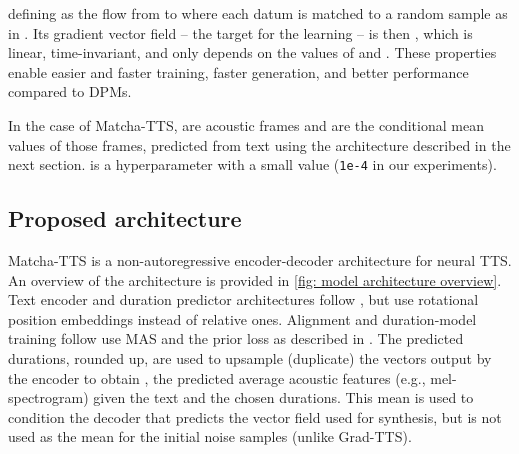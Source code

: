 \documentclass[british]{article}
\begin{document}
defining  as the flow from  to  where each datum  is matched to a random sample  as in \cite{lipman2023flow}.
Its gradient vector field -- the target for the learning -- is then , which is linear, time-invariant, and only depends on the values of  and .
These properties enable easier and faster training, faster generation, and better performance compared to DPMs.


In the case of Matcha-TTS,  are acoustic frames and  are the conditional mean values of those frames, predicted from text using the architecture described in the next section.
 is a hyperparameter with a small value (\texttt{1e-4} in our experiments).








\subsection{Proposed architecture}
\label{ssec:matcha}


Matcha-TTS is a non-autoregressive encoder-decoder architecture for neural TTS.
An overview of the architecture is provided in \cref{fig: model architecture overview}.
Text encoder and duration predictor architectures follow \cite{kim2020glow,popov2021grad}, but use rotational position embeddings \cite{su2021roformer} instead of relative ones.
Alignment and duration-model training follow use MAS and the prior loss  as described in \cite{popov2021grad}.
The predicted durations, rounded up, are used to upsample (duplicate) the vectors output by the encoder to obtain , the predicted average acoustic features (e.g., mel-spectrogram) given the text and the chosen durations.
This mean is used to condition the decoder that predicts the vector field  used for synthesis, but is not used as the mean for the initial noise samples  (unlike Grad-TTS).
\end{document}
